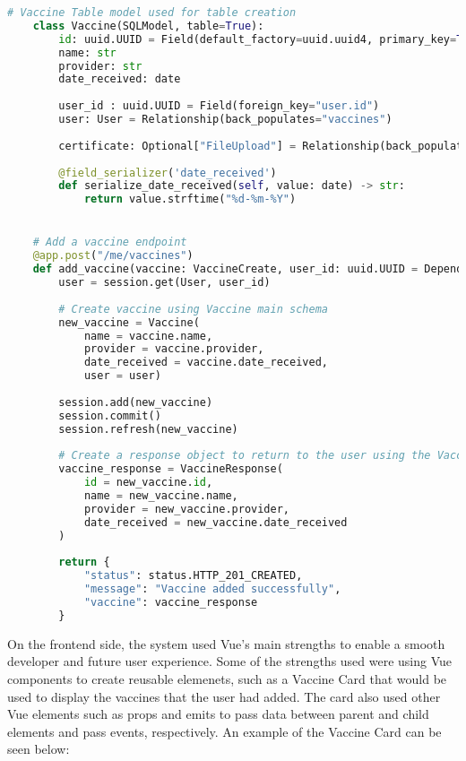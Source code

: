 \begin{lstlisting}[language=Python, caption=SQLModel Vaccine Schema]
    # Vaccine Table model used for table creation
    class Vaccine(SQLModel, table=True):
        id: uuid.UUID = Field(default_factory=uuid.uuid4, primary_key=True)
        name: str
        provider: str
        date_received: date
        
        user_id : uuid.UUID = Field(foreign_key="user.id")
        user: User = Relationship(back_populates="vaccines")
        
        certificate: Optional["FileUpload"] = Relationship(back_populates="vaccine", cascade_delete=True)
        
        @field_serializer('date_received')
        def serialize_date_received(self, value: date) -> str:
            return value.strftime("%d-%m-%Y")


    # Add a vaccine endpoint
    @app.post("/me/vaccines")
    def add_vaccine(vaccine: VaccineCreate, user_id: uuid.UUID = Depends(validate_session), session: Session = Depends(get_session)):
        user = session.get(User, user_id)
        
        # Create vaccine using Vaccine main schema
        new_vaccine = Vaccine(
            name = vaccine.name,
            provider = vaccine.provider,
            date_received = vaccine.date_received,
            user = user)
                
        session.add(new_vaccine)
        session.commit()
        session.refresh(new_vaccine)
        
        # Create a response object to return to the user using the VaccineResponse schema
        vaccine_response = VaccineResponse(
            id = new_vaccine.id,
            name = new_vaccine.name,
            provider = new_vaccine.provider,
            date_received = new_vaccine.date_received
        )
                
        return {
            "status": status.HTTP_201_CREATED,
            "message": "Vaccine added successfully",
            "vaccine": vaccine_response
        }
\end{lstlisting}

On the frontend side, the system used Vue's main strengths to enable a smooth developer and future user experience. Some of the strengths used were using Vue components to create reusable elemenets, such as a Vaccine Card that would be used to display the vaccines that the user had added. The card also used other Vue elements such as props and emits to pass data between parent and child elements and pass events, respectively. An example of the Vaccine Card can be seen below:

